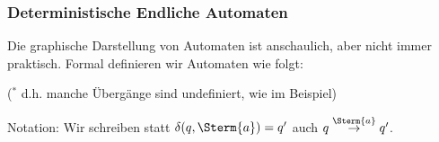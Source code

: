 \documentclass[aspectratio=1610,onlymath]{beamer}
\begin{document}
\begin{frame}\frametitle{Deterministische Endliche Automaten}

Die graphische Darstellung von Automaten ist anschaulich, aber nicht immer praktisch.
Formal definieren wir Automaten wie folgt:\bigskip

{\footnotesize (\alert{$^*$} d.h. manche Übergänge sind undefiniert, wie im Beispiel)}
\medskip

\alert{Notation:} Wir schreiben statt $\delta(q,\Sterm{a})=q'$ auch $q\stackrel{\Sterm{a}}{\to}q'$.

% 

\end{frame}
\end{document}
